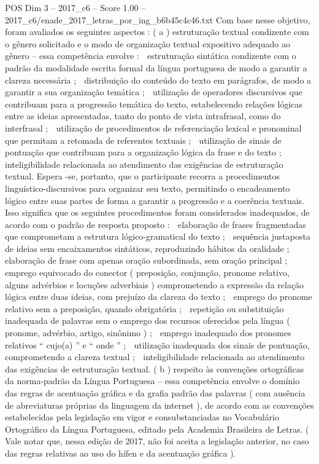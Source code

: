 \begin{textsample}{POS Dim 3 – 2017\_c6 – Score 1.00 – 2017\_c6/enade\_2017\_letras\_por\_ing\_b6b45c4c46.txt}
Com base nesse objetivo, foram avaliados os seguintes aspectos : ( a ) estruturação textual condizente com o gênero solicitado e o modo de organização textual expositivo adequado ao gênero – essa competência envolve :  estruturação sintática condizente com o padrão da modalidade escrita formal da língua portuguesa de modo a garantir a clareza necessária ;  distribuição do conteúdo do texto em parágrafos, de modo a garantir a sua organização temática ;  utilização de operadores discursivos que contribuam para a progressão temática do texto, estabelecendo relações lógicas entre as ideias apresentadas, tanto do ponto de vista intrafrasal, como do interfrasal ;  utilização de procedimentos de referenciação lexical e pronominal que permitam a retomada de referentes textuais ;  utilização de sinais de pontuação que contribuam para a organização lógica da frase e do texto ;  inteligibilidade relacionada ao atendimento das exigências de estruturação textual.
Espera -se, portanto, que o participante recorra a procedimentos linguístico-discursivos para organizar seu texto, permitindo o encadeamento lógico entre suas partes de forma a garantir a progressão e a coerência textuais.
Isso significa que os seguintes procedimentos foram considerados inadequados, de acordo com o padrão de resposta proposto :  elaboração de frases fragmentadas que comprometam a estrutura lógico-gramatical do texto ;  sequência justaposta de ideias sem encaixamentos sintáticos, reproduzindo hábitos da oralidade ;  elaboração de frase com apenas oração subordinada, sem oração principal ;  emprego equivocado do conector ( preposição, conjunção, pronome relativo, alguns advérbios e locuções adverbiais ) comprometendo a expressão da relação lógica entre duas ideias, com prejuízo da clareza do texto ;  emprego do pronome relativo sem a preposição, quando obrigatória ;  repetição ou substituição inadequada de palavras sem o emprego dos recursos oferecidos pela língua ( pronome, advérbio, artigo, sinônimo ) ;  emprego inadequado dos pronomes relativos “ cujo(a) ” e “ onde ” ;  utilização inadequada dos sinais de pontuação, comprometendo a clareza textual ;  inteligibilidade relacionada ao atendimento das exigências de estruturação textual. ( b ) respeito às convenções ortográficas da norma-padrão da Língua Portuguesa – essa competência envolve o domínio das regras de acentuação gráfica e da grafia padrão das palavras ( com ausência de abreviaturas próprias da linguagem da internet ), de acordo com as convenções estabelecidas pela legislação em vigor e consubstanciadas no Vocabulário Ortográfico da Língua Portuguesa, editado pela Academia Brasileira de Letras. ( Vale notar que, nessa edição de 2017, não foi aceita a legislação anterior, no caso das regras relativas ao uso do hífen e da acentuação gráfica ).

\end{textsample}
